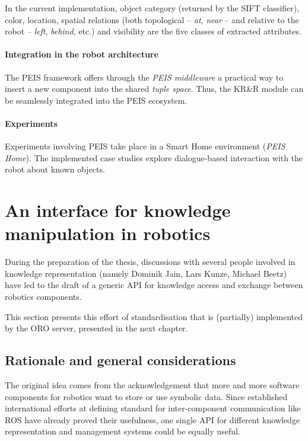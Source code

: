 In the current implementation, object category (returned by the SIFT
classifier), color, location, spatial relations (both topological -- \emph{at},
\emph{near} -- and relative to the robot -- \emph{left}, \emph{behind}, etc.)
and visibility are the five classes of extracted attributes.

\paragraph{Integration in the robot architecture}
\label{sect|peis-integration}

The PEIS framework offers through the \emph{PEIS middleware} a practical way to
insert a new component into the shared \emph{tuple space}.  Thus, the KR\&R
module can be seamlessly integrated into the PEIS ecosystem.

\paragraph{Experiments} Experiments involving PEIS take place in a Smart Home
environment (\emph{PEIS Home}). The implemented case studies explore
dialogue-based interaction with the robot about known objects.


\section{An interface for knowledge manipulation in robotics}
\label{sect|knowledge-api}

During the preparation of the thesis, discussions with several people involved
in knowledge representation (namely Dominik Jain, Lars Kunze, Michael Beetz)
have led to the draft of a generic API for knowledge access and exchange
between robotics components.

This section presents this effort of standardisation that is (partially)
implemented by the ORO server, presented in the next chapter.

\subsection{Rationale and general considerations}

The original idea comes from the acknowledgement that more and more software
components for robotics want to store or use symbolic data. Since established
international efforts at defining standard for inter-component communication
like ROS have already proved their usefulness, one single API for different
knowledge representation and management systems could be equally useful.

